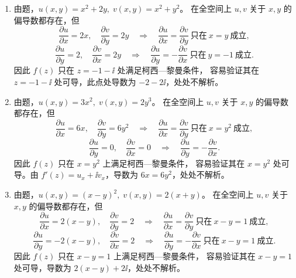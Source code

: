 \begin{question}
\begin{solution}
\begin{enumerate}
  \item 由题，\(u(x,y)=x^2+2y,\;v(x,y)=x^2+y^2\)。
  在全空间上 \(u,v\) 关于 \(x,y\) 的偏导数都存在，但
  \[
  \frac{\partial u}{\partial x}=2x,\quad
  \frac{\partial v}{\partial y}=2y\quad\Longrightarrow\quad
  \frac{\partial u}{\partial x}=\frac{\partial v}{\partial y}\ \text{只在}\ x=y\ \text{成立},
  \]
  \[
  \frac{\partial u}{\partial y}=2,\quad
  \frac{\partial v}{\partial x}=2y\quad\Longrightarrow\quad
  \frac{\partial u}{\partial y}=-\frac{\partial v}{\partial x}\ \text{只在}\ y=-1\ \text{成立}.
  \]
  因此 \(f(z)\) 只在 \(z=-1-\ii\) 处满足柯西—黎曼条件，
  容易验证其在 \(z=-1-\ii\) 处可导，此点处导数为 \(-2-2\ii\)，处处不解析。

  \item 由题，\(u(x,y)=3x^2,\;v(x,y)=2y^3\)。
  在全空间上 \(u,v\) 关于 \(x,y\) 的偏导数都存在，但
  \[
  \frac{\partial u}{\partial x}=6x,\quad
  \frac{\partial v}{\partial y}=6y^2\quad\Longrightarrow\quad
  \frac{\partial u}{\partial x}=\frac{\partial v}{\partial y}\ \text{只在}\ x=y^2\ \text{成立},
  \]
  \[
  \frac{\partial u}{\partial y}=0,\quad
  \frac{\partial v}{\partial x}=0\quad\Longrightarrow\quad
  \frac{\partial u}{\partial y}=-\frac{\partial v}{\partial x}.
  \]
  因此 \(f(z)\) 只在 \(x=y^2\) 上满足柯西—黎曼条件，
  容易验证其在 \(x=y^2\) 处可导。由
  \(f'(z)=u_x+\ii v_x\)，导数为 \(6x=6y^2\)，处处不解析。

  \item 由题，\(u(x,y)=(x-y)^2,\;v(x,y)=2(x+y)\)。
  在全空间上 \(u,v\) 关于 \(x,y\) 的偏导数都存在，但
  \[
  \frac{\partial u}{\partial x}=2(x-y),\quad
  \frac{\partial v}{\partial y}=2\quad\Longrightarrow\quad
  \frac{\partial u}{\partial x}=\frac{\partial v}{\partial y}\ \text{只在}\ x-y=1\ \text{成立},
  \]
  \[
  \frac{\partial u}{\partial y}=-2(x-y),\quad
  \frac{\partial v}{\partial x}=2\quad\Longrightarrow\quad
  \frac{\partial u}{\partial y}=-\frac{\partial v}{\partial x}\ \text{只在}\ x-y=1\ \text{成立}.
  \]
  因此 \(f(z)\) 只在 \(x-y=1\) 上满足柯西—黎曼条件，
  容易验证其在 \(x-y=1\) 处可导，导数为 \(2(x-y)+2\ii\)，处处不解析。
\end{enumerate}
\end{solution}
\end{question}


